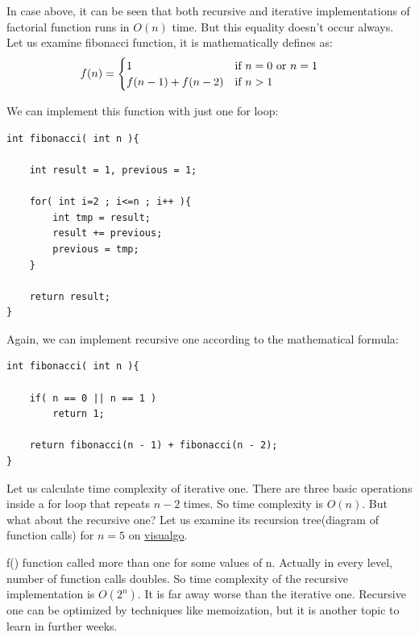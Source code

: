 \documentclass[12pt]{article}
\begin{document}
In case above, it can be seen that both recursive and iterative implementations of factorial function runs in $O(n)$ time. But this equality doesn't occur always. Let us examine fibonacci function, it is mathematically defines as:
\begin{align*}
    f(n) &= \begin{cases}
    1 & \text{if $n = 0$ or $n = 1$\,\, } \\
    f(n - 1) + f(n - 2) & \text{if $n > 1$\,\,}
    \end{cases}
\end{align*}

We can implement this function with just one for loop:

\begin{verbatim}
int fibonacci( int n ){

    int result = 1, previous = 1;

    for( int i=2 ; i<=n ; i++ ){
        int tmp = result;
        result += previous;
        previous = tmp;
    }

    return result;
}
\end{verbatim}

Again, we can implement recursive one according to the mathematical formula:

\begin{verbatim}
int fibonacci( int n ){

    if( n == 0 || n == 1 )
        return 1;
    
    return fibonacci(n - 1) + fibonacci(n - 2);
}
\end{verbatim}

Let us calculate time complexity of iterative one. There are three basic operations inside a for loop that repeats $n-2$ times. So time complexity is $O(n)$. But what about the recursive one? Let us examine its recursion tree(diagram of function calls) for $n = 5$ on \href{https://visualgo.net/en/recursion}{visualgo}.


f() function called more than one for some values of n. Actually in every level, number of function calls doubles. So time complexity of the recursive implementation is $O(2^n)$. It is far away worse than the iterative one. Recursive one can be optimized by techniques like memoization, but it is another topic to learn in further weeks.
\end{document}
